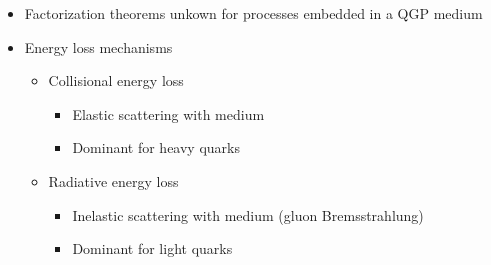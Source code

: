 \begin{frame}
\begin{columns}
    \begin{itemize}
    \item Factorization theorems unkown for processes embedded in a QGP medium
    \item Energy loss mechanisms
      \begin{itemize}
      \item Collisional energy loss
        \begin{itemize}
        \item Elastic scattering with medium
        \item Dominant for heavy quarks
        \end{itemize}
      \item Radiative energy loss
        \begin{itemize}
        \item Inelastic scattering with medium (gluon Bremsstrahlung)
        \item Dominant for light quarks
        \end{itemize}
      \end{itemize}
    \end{itemize}
  \end{columns}
\end{frame}
